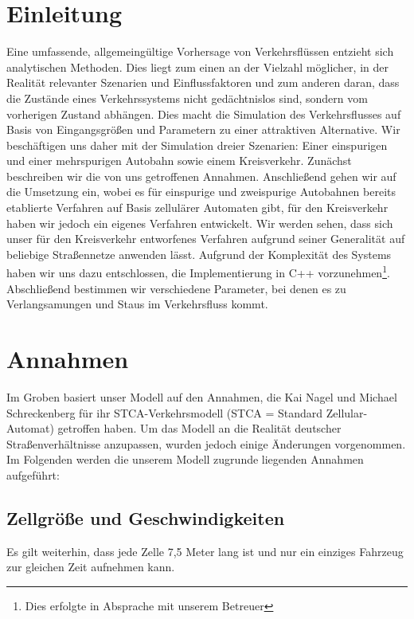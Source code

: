 \documentclass[10pt, a4paper]{article}
\begin{document}
\newpage
\section{Einleitung}
\label{sec:einleitung}
Eine umfassende, allgemeingültige Vorhersage von Verkehrsflüssen entzieht sich analytischen Methoden. Dies liegt zum einen an der Vielzahl möglicher, in der Realität relevanter Szenarien und Einflussfaktoren und zum anderen daran, dass die Zustände eines Verkehrssystems nicht gedächtnislos sind, sondern vom vorherigen Zustand abhängen. Dies macht die Simulation des Verkehrsflusses auf Basis von Eingangsgrößen und Parametern zu einer attraktiven Alternative. Wir beschäftigen uns daher mit der Simulation dreier Szenarien: Einer einspurigen und einer mehrspurigen Autobahn sowie einem Kreisverkehr. Zunächst beschreiben wir die von uns getroffenen Annahmen. Anschließend gehen wir auf die Umsetzung ein, wobei es für einspurige und zweispurige Autobahnen bereits etablierte Verfahren auf Basis zellulärer Automaten gibt, für den Kreisverkehr haben wir jedoch ein eigenes Verfahren entwickelt. Wir werden sehen, dass sich unser für den Kreisverkehr entworfenes Verfahren aufgrund seiner Generalität auf beliebige Straßennetze anwenden lässt. Aufgrund der Komplexität des Systems haben wir uns dazu entschlossen, die Implementierung in C++ vorzunehmen\footnote{Dies erfolgte in Absprache mit unserem Betreuer}. Abschließend bestimmen wir verschiedene Parameter, bei denen es zu Verlangsamungen und Staus im Verkehrsfluss kommt.

\section{Annahmen}
\label{sec:annahmen}

Im Groben basiert unser Modell auf den Annahmen, die Kai Nagel und Michael Schreckenberg \cite{nagel-schreckenberg} für ihr STCA-Verkehrsmodell (STCA = Standard Zellular-Automat) getroffen haben. Um das Modell an die Realität deutscher Straßenverhältnisse anzupassen, wurden jedoch einige Änderungen vorgenommen.
Im Folgenden werden die unserem Modell zugrunde liegenden Annahmen aufgeführt:%

\subsection{Zellgröße und Geschwindigkeiten}

Es gilt weiterhin, dass jede Zelle 7,5 Meter lang ist und nur ein einziges Fahrzeug zur gleichen Zeit aufnehmen kann.
\end{document}
